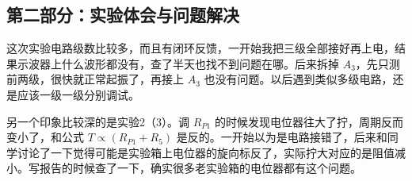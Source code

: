 \documentclass[10.5pt]{config}
\begin{document}
\subsection*{第二部分：实验体会与问题解决}

这次实验电路级数比较多，而且有闭环反馈，一开始我把三级全部接好再上电，结果示波器上什么波形都没有，查了半天也找不到问题在哪。后来拆掉 $A_3$，先只测前两级，很快就正常起振了，再接上 $A_3$ 也没有问题。以后遇到类似多级电路，还是应该一级一级分别调试。

另一个印象比较深的是实验2（3）。调 $R_{P1}$ 的时候发现电位器往大了拧，周期反而变小了，和公式 $T \propto (R_{P1}+R_5)$ 是反的。一开始以为是电路接错了，后来和同学讨论了一下觉得可能是实验箱上电位器的旋向标反了，实际拧大对应的是阻值减小。写报告的时候查了一下，确实很多老实验箱的电位器都有这个问题。
\end{document}
